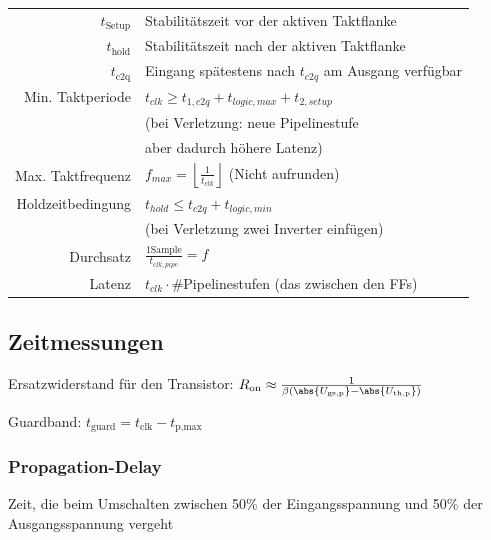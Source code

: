 \documentclass[english]{latex4ei/latex4ei_sheet}
\begin{document}
\begin{tabular}{rl}
    $t_{\text{Setup}}$ & Stabilitätszeit vor der aktiven Taktflanke                                        \\
    $t_{\text{hold}}$  & Stabilitätszeit nach  der aktiven Taktflanke                                      \\
    $t_{\text{c2q}}$   & Eingang spätestens nach $t_{c2q}$ am Ausgang verfügbar                            \\
    Min. Taktperiode   & $t_{clk} \ge t_{1,c2q} + t_{logic,max} + t_{2,setup}$                             \\
                       & (bei Verletzung: neue Pipelinestufe                                               \\
                       & aber dadurch höhere Latenz)                                                       \\
    Max. Taktfrequenz  & $f_{max} = \left\lfloor \frac{1}{t_{clk}} \right\rfloor$ \qquad (Nicht aufrunden) \\
    Holdzeitbedingung  & $t_{hold} \le t_{c2q} + t_{logic,min}$                                            \\
                       & (bei Verletzung zwei Inverter einfügen)                                           \\
    Durchsatz          & $\frac{1 \text{Sample}}{t_{clk,pipe}} = f$                                        \\
    Latenz             & $t_{clk} \cdot \#$Pipelinestufen (das zwischen den FFs)                           \\
\end{tabular}

\subsection{Zeitmessungen}

Ersatzwiderstand für den Transistor: $R_{\text{on}} \approx \frac{1}{\beta (\abs{U_{\text{gs,p}}}-\abs{U_{\text{th,p}}})}$

Guardband: $t_{\text{guard}} = t_{\text{clk}}-t_{\text{p,max}}$

\subsubsection{Propagation-Delay}
Zeit, die beim Umschalten zwischen 50\% der Eingangsspannung und 50\% der Ausgangsspannung vergeht
\end{document}
